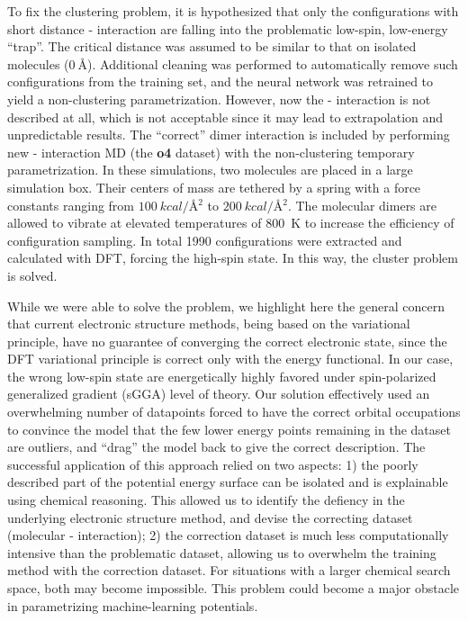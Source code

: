 \documentclass[manuscript=cmatex]{achemso}
\begin{document}
To fix the clustering problem, it is hypothesized that only the configurations with short distance - interaction are falling into the problematic low-spin, low-energy ``trap''. The critical distance was assumed to be similar to that on isolated molecules (\textbf{$\SI{0}{\angstrom}$}). Additional cleaning was performed to automatically remove such configurations from the training set, and the neural network was retrained to yield a non-clustering parametrization. However, now the - interaction is not described at all, which is not acceptable since it may lead to extrapolation and unpredictable results. The ``correct'' dimer interaction is included by performing new - interaction MD (the \textbf{o4} dataset) with the non-clustering temporary parametrization. In these simulations, two  molecules are placed in a large simulation box. Their centers of mass are tethered by a spring with a force constants ranging from $\SI{100}{kcal/\angstrom^2}$ to $\SI{200}{kcal/\angstrom^2}$. The molecular dimers are allowed to vibrate at elevated temperatures of \SI{800}{K} to increase the efficiency of configuration sampling. In total 1990 configurations were extracted and calculated with DFT, forcing the high-spin state. In this way, the cluster problem is solved.

While we were able to solve the problem, we highlight here the general concern that current electronic structure methods, being based on the variational principle, have no guarantee of converging the correct electronic state, since the DFT variational principle is correct only with the energy functional. In our case, the wrong low-spin state are energetically highly favored under spin-polarized generalized gradient (sGGA) level of theory. Our solution effectively used an overwhelming number of datapoints forced to have the correct orbital occupations to convince the model that the few lower energy points remaining in the dataset are outliers, and ``drag'' the model back to give the correct description. The successful application of this approach relied on two aspects: 1) the poorly described part of the potential energy surface can be isolated and is explainable using chemical reasoning. This allowed us to identify the defiency in the underlying electronic structure method, and devise the correcting dataset (molecular - interaction); 2) the correction dataset is much less computationally intensive than the problematic dataset, allowing us to overwhelm the training method with the correction dataset. For situations with a larger chemical search space, both may become impossible. This problem could become a major obstacle in parametrizing machine-learning potentials. 
\end{document}
